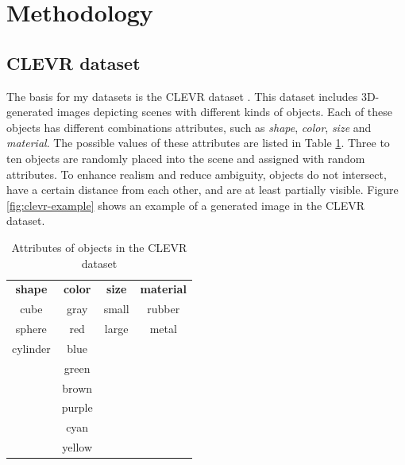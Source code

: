 \section{Methodology}
\label{sec:methodology}

\subsection{CLEVR dataset}
The basis for my datasets is the CLEVR dataset \citep{Johnson2016}.
This dataset includes 3D-generated images depicting scenes with different kinds of objects.
Each of these objects has different combinations attributes, such as \emph{shape}, \emph{color}, \emph{size} and \emph{material}.
The possible values of these attributes are listed in Table \ref{tab:clevr-attributes}.
Three to ten objects are randomly placed into the scene and assigned with random attributes.
To enhance realism and reduce ambiguity, objects do not intersect, have a certain distance from each other, and are at least partially visible.
Figure \ref{fig:clevr-example} shows an example of a generated image in the CLEVR dataset.

\begin{table}[h]
    \centering
    \begin{tabular}{cccc}
        \toprule
        \textbf{ shape } & \textbf{ color } & \textbf{ size } & \textbf{ material } \\
        cube             & gray             & small           & rubber              \\
        sphere           & red              & large           & metal               \\
        cylinder         & blue                                                     \\
                         & green                                                    \\
                         & brown                                                    \\
                         & purple                                                   \\
                         & cyan                                                     \\
                         & yellow                                                   \\
        \bottomrule
    \end{tabular}
    \caption{Attributes of objects in the CLEVR dataset}
    \label{tab:clevr-attributes}
\end{table}

